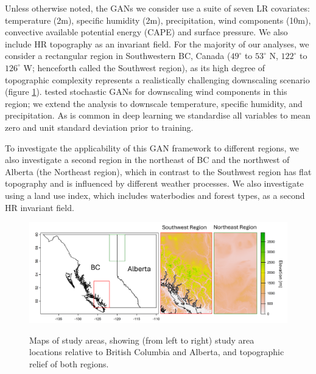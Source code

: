 \documentclass{ametsocV6.1}
\begin{document}
Unless otherwise noted, the GANs we consider use a suite of seven LR covariates: temperature (2m), specific humidity (2m), precipitation, wind components (10m), convective available potential energy (CAPE) and surface pressure. We also include HR topography as an invariant field. For the majority of our analyses, we consider a rectangular region in Southwestern BC, Canada ($49^\circ$ to $53^\circ$ N, $122^\circ$ to $126^\circ$ W; henceforth called the Southwest region), as its high degree of topographic complexity represents a realistically challenging downscaling scenario (figure \ref{studyarea}). \citet{daust2024capturing} tested stochastic GANs for downscaling wind components in this region; we extend the analysis to downscale temperature, specific humidity, and precipitation. As is common in deep learning we standardise all variables to mean zero and unit standard deviation prior to training. 

To investigate the applicability of this GAN framework to different regions, we also investigate a second region in the northeast of BC and the northwest of Alberta (the Northeast region), which in contrast to the Southwest region has flat topography and is influenced by different weather processes. We also investigate using a land use index, which includes waterbodies and forest types, as a second HR invariant field.

\begin{figure}[H]
  \noindent\includegraphics[width=\textwidth,angle=0]{final/Regions_Fig.png}\\
  \caption{Maps of study areas, showing (from left to right) study area locations relative to British Columbia and Alberta, and topographic relief of both regions.}\label{studyarea}
\end{figure}
\end{document}
